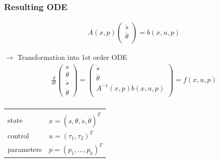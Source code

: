 \begin{frame}[c]
	\frametitle{Resulting ODE}
	\vspace{-0.5cm}
	\begin{align*}
		&A(x,p)
		\begin{pmatrix} 
			\ddot{s} \\ \ddot{\theta} \\
		\end{pmatrix}
		= b(x,u,p)
	\end{align*}
	
	$\rightarrow$ Transformation into 1st order ODE
	\begin{align*}
		&\frac{d}{dt}
		\begin{pmatrix}
			s \\ \theta \\ \dot{s} \\ \dot{\theta}
		\end{pmatrix}
		=
		\begin{pmatrix}
			\dot{s} \\ \dot{\theta} \\ A^{-1}(x,p)b(x,u,p) \\
		\end{pmatrix} 
		= f(x,u,p) \\
	\end{align*}
	
	\vspace{-1.0cm}
	\begin{tabular}{ll}
		& \\
		state & $ x = (s,\theta,\dot{s},\dot{\theta})^T $ \\
		control & $ u = (\tau_1,\tau_2)^T $ \\
		parameters & $ p = (p_1,...,p_k)^T $ \\
	\end{tabular}
\end{frame}